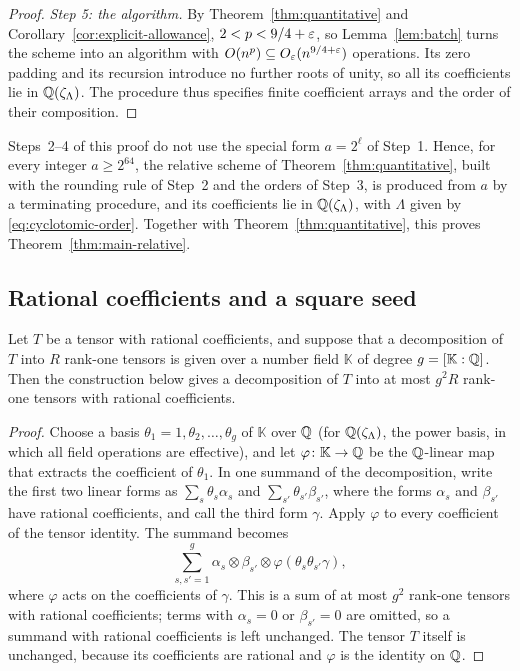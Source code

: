 \begin{proof}
\emph{Step 5: the algorithm.} By Theorem~\ref{thm:quantitative} and
Corollary~\ref{cor:explicit-allowance}, \(2<p<9/4+\varepsilon\), so
Lemma~\ref{lem:batch} turns the scheme into an algorithm with
\(O(n^p)\subseteq O_\varepsilon(n^{9/4+\varepsilon})\) operations. Its zero padding
and its recursion introduce no further roots of unity, so all its
coefficients lie in \(\mathbb Q(\zeta_\Lambda)\). The procedure thus specifies
finite coefficient arrays and the order of their composition.
\end{proof}

\begin{remark}\label{rem:field-every-a}
Steps~2--4 of this proof do not use the special form \(a=2^\ell\) of
Step~1. Hence, for every integer \(a\ge2^{64}\), the relative scheme of
Theorem~\ref{thm:quantitative}, built with the rounding rule of Step~2
and the orders of Step~3, is produced from \(a\) by a terminating
procedure, and its coefficients lie in \(\mathbb Q(\zeta_\Lambda)\), with
\(\Lambda\) given by \eqref{eq:cyclotomic-order}. Together with
Theorem~\ref{thm:quantitative}, this proves
Theorem~\ref{thm:main-relative}.
\end{remark}

\subsection{Rational coefficients and a square seed}
\label{subsec:seed}

\begin{lemma}
\label{lem:descent}
Let \(T\) be a tensor with rational coefficients, and suppose that a
decomposition of \(T\) into \(R\) rank-one tensors is given over a
number field \(\mathbb K\) of degree \(g=[\mathbb K:\mathbb Q]\). Then the
construction below gives a decomposition of \(T\) into at most \(g^2R\)
rank-one tensors with rational coefficients.
\end{lemma}

\begin{proof}
Choose a basis \(\theta_1=1,\theta_2,\ldots,\theta_g\) of \(\mathbb K\)
over \(\mathbb Q\) (for \(\mathbb Q(\zeta_\Lambda)\), the power basis, in which all
field operations are effective), and let \(\varphi\colon\mathbb K\to\mathbb Q\)
be the \(\mathbb Q\)-linear map that extracts the coefficient of \(\theta_1\).
In one summand of the decomposition, write the first two linear forms as
\(\sum_s\theta_s\alpha_s\) and \(\sum_{s'}\theta_{s'}\beta_{s'}\), where
the forms \(\alpha_s\) and \(\beta_{s'}\) have rational coefficients,
and call the third form \(\gamma\). Apply \(\varphi\) to every
coefficient of the tensor identity. The summand becomes
\[
 \sum_{s,s'=1}^{g}\alpha_s\otimes\beta_{s'}\otimes
 \varphi(\theta_s\theta_{s'}\gamma),
\]
where \(\varphi\) acts on the coefficients of \(\gamma\). This is a sum
of at most \(g^2\) rank-one tensors with rational coefficients; terms
with \(\alpha_s=0\) or \(\beta_{s'}=0\) are omitted, so a summand with
rational coefficients is left unchanged. The tensor \(T\) itself is
unchanged, because its coefficients are rational and \(\varphi\) is the
identity on \(\mathbb Q\).
\end{proof}

